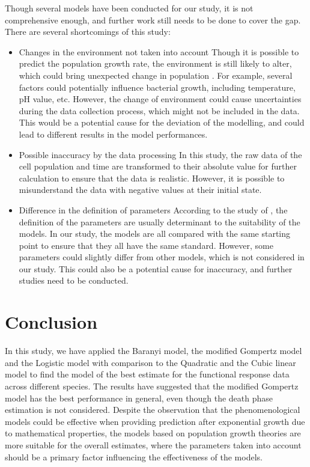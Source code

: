 \documentclass[11pt, oneside]{article}
\begin{document}
	Though several models have been conducted for our study, it is not comprehensive enough, and further work still needs to be done to cover the gap. There are several shortcomings of this study:
	\begin{itemize}
	\item Changes in the environment not taken into account
	\bigbreak
	\noindent Though it is possible to predict the population growth rate, the environment is still likely to alter, which could bring unexpected change in population \cite{sutherland2002behavioural}. For example, several factors could potentially influence bacterial growth, including temperature, pH value, etc. \cite{gale1943factors} However, the change of environment could cause uncertainties during the data collection process, which might not be included in the data. This would be a potential cause for the deviation of the modelling, and could lead to different results in the model performances.
	\item Possible inaccuracy by the data processing
	\bigbreak 
	\noindent In this study, the raw data of the cell population and time are transformed to their absolute value for further calculation to ensure that the data is realistic. However, it is possible to misunderstand the data with negative values at their initial state.
	\bigbreak
	\item Difference in the definition of parameters
	\noindent According to the study of \cite{perni2005estimating}, the definition of the parameters are usually determinant to the suitability of the models. In our study, the models are all compared with the same starting point to ensure that they all have the same standard. However, some parameters could slightly differ from other models, which is not considered in our study. This could also be a potential cause for inaccuracy, and further studies need to be conducted.
	\end{itemize}
	
	\section{Conclusion}
	
	In this study, we have applied the Baranyi model, the modified Gompertz model and the Logistic model with comparison to the Quadratic and the Cubic linear model to find the model of the best estimate for the functional response data across different species. The results have suggested that the modified Gompertz model has the best performance in general, even though the death phase estimation is not considered. Despite the observation that the phenomenological models could be effective when providing prediction after exponential growth due to mathematical properties, the models based on population growth theories are more suitable for the overall estimates, where the parameters taken into account should be a primary factor influencing the effectiveness of the models.
	\pagebreak



\end{document}

